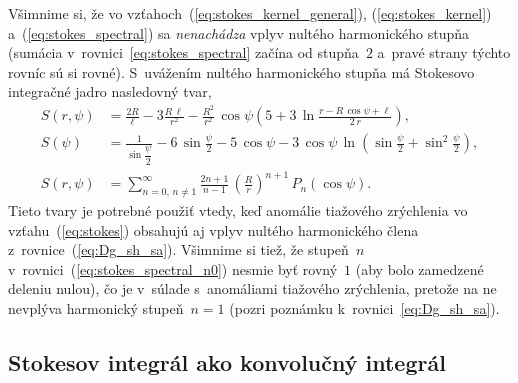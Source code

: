 \documentclass[a4paper,12pt]{book}
\begin{document}
Všimnime si, že vo vzťahoch~(\ref{eq:stokes_kernel_general}), 
(\ref{eq:stokes_kernel}) a~(\ref{eq:stokes_spectral}) sa \emph{nenachádza} 
vplyv nultého harmonického stupňa (sumácia v~rovnici~\ref{eq:stokes_spectral} 
začína od stupňa~$2$ a~pravé strany týchto rovníc sú si rovné).  S~uvážením 
nultého harmonického stupňa má Stokesovo integračné jadro nasledovný tvar,
%
\begin{align}
S(r, \psi) &= \frac{2R}{\ell} - 3\frac{R \, \ell}{r^2} - \frac{R^2}{r^2} \, 
\cos\psi\left( 5 + 3 \, \ln \frac{r - R \, \cos\psi + \ell}{2 \, r} \right){,}
\label{eq:stokes_kernel_general_n0}
\\
%
S(\psi) &= \frac{1}{\sin\dfrac{\psi}{2}} - 6 \, \sin\frac{\psi}{2} - 5 \, 
\cos\psi - 3 \, \cos\psi \, \ln\left( \sin\frac{\psi}{2} + \sin^2\frac{\psi}{2} 
\right){,}
\label{eq:stokes_kernel_n0}
\\
%
S(r, \psi) &= \sum_{n = 0{,}\, n \neq 1}^{\infty} \frac{2n + 1}{n - 1} \, 
\left( \frac{R}{r} \right)^{n + 1} \, P_n(\cos\psi){.}
\label{eq:stokes_spectral_n0}
\end{align}
%
Tieto tvary je potrebné použiť vtedy, keď anomálie tiažového zrýchlenia vo 
vzťahu~(\ref{eq:stokes}) obsahujú aj vplyv nultého harmonického člena 
z~rovnice~(\ref{eq:Dg_sh_sa}).  Všimnime si tiež, že stupeň~$n$ 
v~rovnici~(\ref{eq:stokes_spectral_n0}) nesmie byť rovný~$1$ (aby bolo 
zamedzené deleniu nulou), čo je v~súlade s~anomáliami tiažového zrýchlenia, 
pretože na ne nevplýva harmonický stupeň~$n = 1$ (pozri poznámku 
k~rovnici~\ref{eq:Dg_sh_sa}).


\subsection{Stokesov integrál ako konvolučný integrál}
\label{sec:stokes_convolution}
\end{document}
